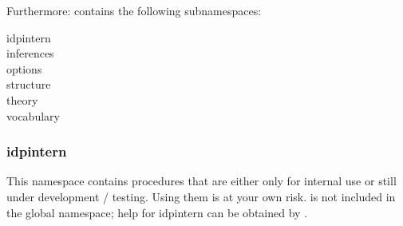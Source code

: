 Furthermore:  contains the following subnamespaces:
\begin{description}
 \item[idpintern]
 \item[inferences]
 \item[options]
 \item[structure]
 \item[theory]
 \item[vocabulary]
\end{description}

\subsubsection{idpintern}
This namespace contains procedures that are either only for internal use or still under development / testing. 
Using them is at your own risk.  
 is not included in the global namespace; help for idpintern can be obtained by .

